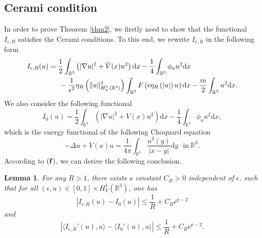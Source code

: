 \documentclass[12pt]{amsart}
\numberwithin{equation}{section}
\newtheorem{lemma}[theorem]{Lemma}
\theoremstyle{definition}
\begin{document}
\subsection{Cerami condition}
    In order to prove Theorem \ref{thm2}, we firstly need to show that the functional $I_{\epsilon,R}$ satisfies the Cerami conditions. To this end, we rewrite $I_{\epsilon,R}$ in the following form
\begin{equation*}
        \begin{aligned}
        I_{\epsilon,R}(u)&=\frac{1}{2}\int_{\mathbb{R}^3}\left(|\nabla u|^{2}+\tilde V(x)u^{2}\right)\text{d}x-\frac{1}{4}\int_{\mathbb{R}^3}\phi_{u}u^{2}\text{d}x\\
    &\indent-\frac{1}{\epsilon ^{2}}\eta _{R}\left (\|u\|^{2}_{H^1_{V}(\mathbb{R}^3)}\right )\int_{\mathbb{R}^{3}}F\left (\epsilon \eta _{R} \left ( \left | u\right |\right )u\right )\text{d}x-\frac{m}{2}\int_{\mathbb{R}^3}u^{2}\text{d}x.
\end{aligned}
    \end{equation*}
   We also consider the following functional
\begin{equation}\label{I0}
I_{0}(u)=\frac{1}{2}\int_{\mathbb R^3}\left(|\nabla u|^2+V(x)u^2\right)\text{d}x-\frac{1}{4}\int_{\mathbb R^3}\phi_{u} u^2\text{d}x,
\end{equation}
which is the energy functional of the following Choquard equation
\begin{equation}\label{eq5.1}
			-\Delta u+V(x)u=\frac{1}{4\pi}\int_{\mathbb R^3}\frac{u^2(y)}{|x-y|}\text{d}y \ \ ~\text{in}~\mathbb{R}^3.
\end{equation}
According to ${\bf (f)}$, we can derive the following conclusion.
\begin{lemma}\label{lem3.5}
       For any $R> 1$, there exists a constant $C_{R} > 0$ independent of $\epsilon $, such that for all $\left ( \epsilon ,u \right )\in \left [ 0,1 \right ]\times H_{V}^{1}\left (  \mathbb{R}^{3}\right )$, one has
      \begin{equation*}
      \left | I_{\epsilon,R }\left ( u \right )-I_{0}\left ( u \right )\right |\leq \frac{1}{R}+C_{R}\epsilon ^{p-2}
      \end{equation*}
      and
      \begin{equation*}
      \left | \langle I_{\epsilon,R }'\left ( u \right ),u\rangle-\langle I_{0}'\left ( u \right ),u\rangle\right |\leq \frac{1}{R}+C_{R}\epsilon ^{p-2}.
        \end{equation*}
\end{lemma}
\end{document}
